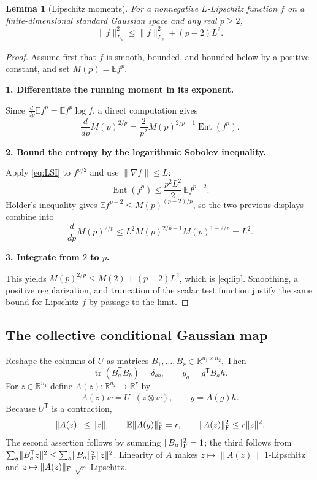 \documentclass[11pt]{article}
\numberwithin{equation}{section}
\newtheorem{lemma}[theorem]{Lemma}
\theoremstyle{definition}\newtheorem{definition}[theorem]{Definition}
\theoremstyle{remark}\newtheorem{remark}[theorem]{Remark}
\newcommand{\R}{\mathbb R}\newcommand{\E}{\mathbb E}\newcommand{\Prob}{\mathbb P}
\newcommand{\tr}{\operatorname{tr}}\newcommand{\Ent}{\operatorname{Ent}}
\newcommand{\norm}[1]{\lVert#1\rVert}\newcommand{\ip}[2]{\langle#1,#2\rangle}
\newcommand{\step}[1]{\par\addvspace{.65\baselineskip}\Needspace{4\baselineskip}\noindent\textbf{#1}\par\nobreak\smallskip}
\begin{document}
\begin{lemma}[Lipschitz moments]\label{lem:lip}
For a nonnegative $L$-Lipschitz function $f$ on a finite-dimensional standard
Gaussian space and any real $p\ge2$,
\begin{equation}\label{eq:lip}
 \norm f_{L_p}^2\le\norm f_{L_2}^2+(p-2)L^2.
\end{equation}
\end{lemma}
\begin{proof}
Assume first that $f$ is smooth, bounded, and bounded below by a positive
constant, and set $M(p)=\E f^p$.

\step{1. Differentiate the running moment in its exponent.}
Since $\frac{d}{dp}\E f^p=\E f^p\log f$, a direct computation gives
\[
 \frac{d}{dp}M(p)^{2/p}
 =\frac2{p^2}M(p)^{2/p-1}\Ent(f^p).
\]

\step{2. Bound the entropy by the logarithmic Sobolev inequality.}
Apply \eqref{eq:LSI} to $f^{p/2}$ and use $\norm{\nabla f}\le L$:
\[
 \Ent(f^p)\le\frac{p^2L^2}2\,\E f^{p-2}.
\]
H\"older's inequality gives $\E f^{p-2}\le M(p)^{(p-2)/p}$, so the two previous
displays combine into
\[
 \frac{d}{dp}M(p)^{2/p}
 \le L^2M(p)^{2/p-1}M(p)^{1-2/p}=L^2.
\]

\step{3. Integrate from $2$ to $p$.}
This yields $M(p)^{2/p}\le M(2)+(p-2)L^2$, which is \eqref{eq:lip}.
Smoothing, a positive regularization, and truncation of the scalar test function
justify the same bound for Lipschitz $f$ by passage to the limit.
\end{proof}

\subsection{The collective conditional Gaussian map}
Reshape the columns of $U$ as matrices $B_1,\ldots,B_r\in\R^{n_1\times n_2}$.
Then
\begin{equation}\label{eq:B-orthonormal}
 \tr(B_a^{\mathsf T}B_b)=\delta_{ab},\qquad
 y_a=g^{\mathsf T}B_a h.
\end{equation}
For $z\in\R^{n_1}$ define $A(z):\R^{n_2}\to\R^r$ by
\begin{equation}\label{eq:A-map}
 A(z)w=U^{\mathsf T}(z\otimes w),\qquad y=A(g)h.
\end{equation}
Because $U^{\mathsf T}$ is a contraction,
\begin{equation}\label{eq:collective}
 \norm{A(z)}\le\norm z,\qquad
 \E\norm{A(g)}_\F^2=r,\qquad
 \norm{A(z)}_\F^2\le r\norm z^2.
\end{equation}
The second assertion follows by summing $\norm{B_a}_\F^2=1$; the third follows from
$\sum_a\norm{B_a^{\mathsf T}z}^2\le\sum_a\norm{B_a}_\F^2\norm z^2$.
Linearity of $A$ makes $z\mapsto\norm{A(z)}$ $1$-Lipschitz and
$z\mapsto\norm{A(z)}_\F$ $\sqrt r$-Lipschitz.
\end{document}

